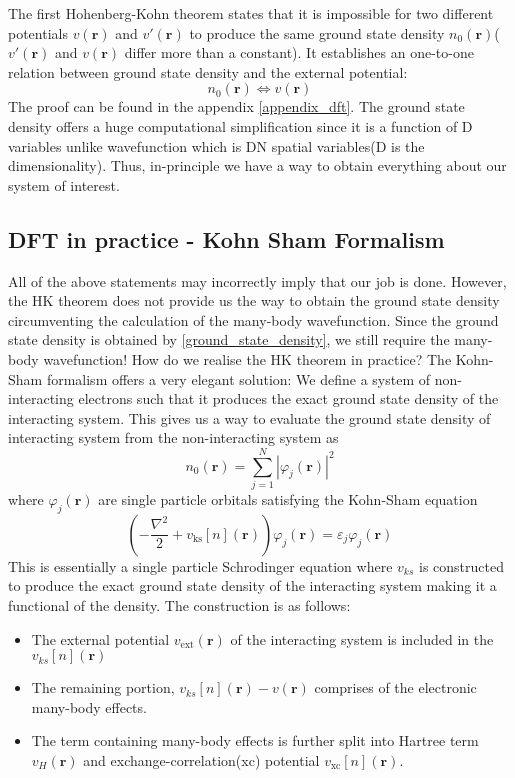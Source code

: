 The first Hohenberg-Kohn theorem states that it is impossible for two different potentials $v(\mathbf{r})$ and $v'(\mathbf{r})$ to produce the same ground state density $n_0(\mathbf{r})$($v'(\mathbf{r})$ and $v(\mathbf{r})$ differ more than a constant). It establishes an one-to-one relation between ground state density and the external potential:
\begin{equation*}
    n_0(\mathbf{r}) \Leftrightarrow v(\mathbf{r})
\end{equation*}
The proof can be found in the appendix \ref{appendix_dft}. The ground state density offers a huge computational simplification since it is a function of D variables unlike wavefunction which is DN spatial variables(D is the dimensionality).  Thus, in-principle we have a way to obtain everything about our system of interest. 
\subsection{DFT in practice - Kohn Sham Formalism}
All of the above statements may incorrectly imply that our job is done. However, the HK theorem does not provide us the way to obtain the ground state density circumventing the calculation of the many-body wavefunction. Since the ground state density is obtained by \eqref{ground_state_density}, we still require the many-body wavefunction! How do we realise the HK theorem in practice? The Kohn-Sham formalism\cite{ks_dft} offers a very elegant solution: We define a system of non-interacting electrons such that it produces the exact ground state density of the interacting system. This gives us a way to evaluate the ground state density of interacting system from the non-interacting system as
\begin{equation}\label{KS_density}
    n_0(\mathbf{r}) = \sum_{j=1}^N |\varphi_j(\mathbf{r})|^2
\end{equation}
where $\varphi_j(\mathbf{r})$ are single particle orbitals satisfying the Kohn-Sham equation
\begin{equation}\label{KS_eqn}
    \left(-\frac{\nabla^2}{2} + v_{\text{ks}}[n](\mathbf{r})\right)\varphi_j(\mathbf{r}) = \varepsilon_j\varphi_j(\mathbf{r})
\end{equation}
This is essentially a single particle Schrodinger equation where $v_{ks}$ is constructed to produce the exact ground state density of the interacting system making it a functional of the density. The construction is as follows: 
\begin{itemize}
    \item The external potential $v_{\text{ext}}(\mathbf{r})$ of the interacting system is included in the $v_{ks}[n](\mathbf{r})$
    \item The remaining portion, $v_{ks}[n](\mathbf{r}) - v(\mathbf{r})$ comprises of the electronic many-body effects.
    \item The term containing many-body effects is further split into Hartree term $v_H(\mathbf{r})$ and exchange-correlation(xc) potential $v_{\text{xc}}[n](\mathbf{r})$.
\end{itemize}
